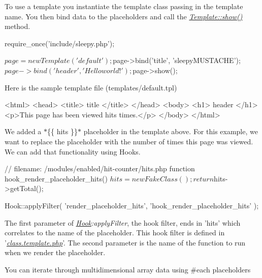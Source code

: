 To use a template you instantiate the template class passing in the template name. You then bind data to the placeholders and call the {\itshape \hyperlink{class_template_a2b8e3779f5bd8c38f70307574859bd36}{Template\-::show()}} method. \begin{DoxyVerb}           require_once('include/sleepy.php');

           $page = new Template('default');
           $page->bind('title', 'sleepyMUSTACHE');
           $page->bind('header', 'Hello world!');
           $page->show();
\end{DoxyVerb}


Here is the sample template file (templates/default.\-tpl) \begin{DoxyVerb}           <html>
                          <head>
                                         <title>{{ title }}</title>
                          </head>
                          <body>
                                         <h1>{{ header }}</h1>
                                         <p>This page has been viewed {{ hits }} times.</p>
                          </body>
           </html>
\end{DoxyVerb}


We added a $\ast$\{\{ hits \}\}$\ast$ placeholder in the template above. For this example, we want to replace the placeholder with the number of times this page was viewed. We can add that functionality using Hooks. \begin{DoxyVerb}           // filename: /modules/enabled/hit-counter/hits.php
           function hook_render_placeholder_hits() {
                          $hits = new FakeClass();

                          return $hits->getTotal();
           }

           Hook::applyFilter(
                          'render_placeholder_hits',
                          'hook_render_placeholder_hits'
           );
\end{DoxyVerb}


The first parameter of {\itshape \hyperlink{class_hook}{Hook}\-:apply\-Filter}, the hook filter, ends in 'hits' which correlates to the name of the placeholder. This hook filter is defined in '{\itshape \hyperlink{class_8template_8php}{class.\-template.\-php}}'. The second parameter is the name of the function to run when we render the placeholder.

You can iterate through multidimensional array data using \#each placeholders 


